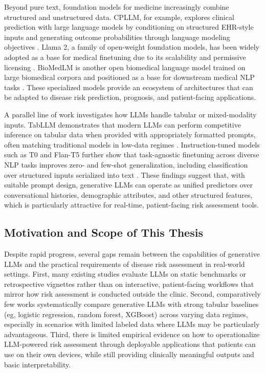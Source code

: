 Beyond pure text, foundation models for medicine increasingly combine structured and unstructured data. CPLLM, for example, explores clinical prediction with large language models by conditioning on structured EHR-style inputs and generating outcome probabilities through language modeling objectives \cite{benshoham2024cpllm}. Llama 2, a family of open-weight foundation models, has been widely adopted as a base for medical finetuning due to its scalability and permissive licensing \cite{touvron2023llama2}. BioMedLM is another open biomedical language model trained on large biomedical corpora and positioned as a base for downstream medical NLP tasks \cite{bolton2024biomedlm}. These specialized models provide an ecosystem of architectures that can be adapted to disease risk prediction, prognosis, and patient-facing applications.

A parallel line of work investigates how LLMs handle tabular or mixed-modality inputs. TabLLM demonstrates that modern LLMs can perform competitive inference on tabular data when provided with appropriately formatted prompts, often matching traditional models in low-data regimes \cite{hegselmann2022tabllm}. Instruction-tuned models such as T0 and Flan-T5 further show that task-agnostic finetuning across diverse NLP tasks improves zero- and few-shot generalization, including classification over structured inputs serialized into text \cite{sanh2021multitask,chung2024scaling}. These findings suggest that, with suitable prompt design, generative LLMs can operate as unified predictors over conversational histories, demographic attributes, and other structured features, which is particularly attractive for real-time, patient-facing risk assessment tools.

\subsection{Motivation and Scope of This Thesis}

Despite rapid progress, several gaps remain between the capabilities of generative LLMs and the practical requirements of disease risk assessment in real-world settings. First, many existing studies evaluate LLMs on static benchmarks or retrospective vignettes rather than on interactive, patient-facing workflows that mirror how risk assessment is conducted outside the clinic. Second, comparatively few works systematically compare generative LLMs with strong tabular baselines (eg, logistic regression, random forest, XGBoost) across varying data regimes, especially in scenarios with limited labeled data where LLMs may be particularly advantageous. Third, there is limited empirical evidence on how to operationalize LLM-powered risk assessment through deployable applications that patients can use on their own devices, while still providing clinically meaningful outputs and basic interpretability.

